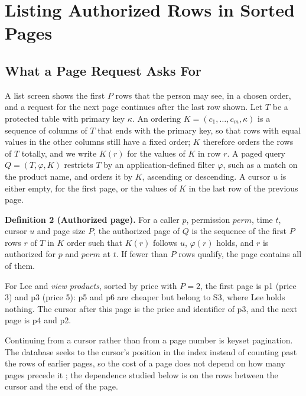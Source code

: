 \documentclass[conference]{IEEEtran}
\begin{document}
\section{Listing Authorized Rows in Sorted Pages}\label{sec-3}

\subsection{What a Page Request Asks For}\label{sec-3-1}

A list screen shows the first \(P\) rows that the person may see, in a chosen order, and a request for the next page continues after the last row shown. Let \(T\) be a protected table with primary key \(\kappa\). An ordering \(K = (c_1, \ldots, c_m, \kappa)\) is a sequence of columns of \(T\) that ends with the primary key, so that rows with equal values in the other columns still have a fixed order; \(K\) therefore orders the rows of \(T\) totally, and we write \(K(r)\) for the values of \(K\) in row \(r\). A paged query \(Q = (T, \varphi, K)\) restricts \(T\) by an application-defined filter \(\varphi\), such as a match on the product name, and orders it by \(K\), ascending or descending. A cursor \(u\) is either empty, for the first page, or the values of \(K\) in the last row of the previous page.

\textbf{Definition 2 (Authorized page).} For a caller \(p\), permission \(\mathit{perm}\), time \(t\), cursor \(u\) and page size \(P\), the authorized page of \(Q\) is the sequence of the first \(P\) rows \(r\) of \(T\) in \(K\) order such that \(K(r)\) follows \(u\), \(\varphi(r)\) holds, and \(r\) is authorized for \(p\) and \(\mathit{perm}\) at \(t\). If fewer than \(P\) rows qualify, the page contains all of them.

For Lee and \emph{view products}, sorted by price with \(P = 2\), the first page is p1 (price 3) and p3 (price 5): p5 and p6 are cheaper but belong to S3, where Lee holds nothing. The cursor after this page is the price and identifier of p3, and the next page is p4 and p2.

Continuing from a cursor rather than from a page number is keyset pagination. The database seeks to the cursor's position in the index instead of counting past the rows of earlier pages, so the cost of a page does not depend on how many pages precede it \cite{ref8}; the dependence studied below is on the rows between the cursor and the end of the page.
\end{document}
